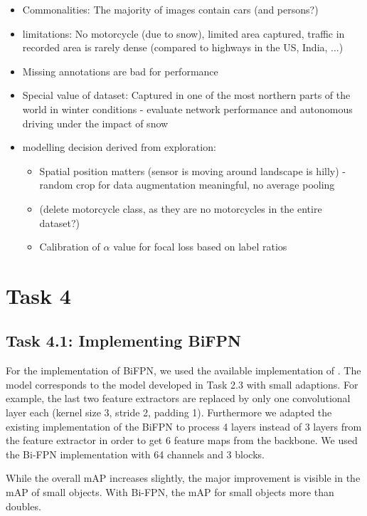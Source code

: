 \documentclass{article}
\begin{document}
\begin{itemize}
    \item Commonalities: The majority of images contain cars (and persons?)
    \item limitations: No motorcycle (due to snow), limited area captured, traffic in recorded area is rarely dense (compared to highways in the US, India, ...)
    \item Missing annotations are bad for performance
    \item Special value of dataset: Captured in one of the most northern parts of the world in winter conditions - evaluate network performance and autonomous driving under the impact of snow
    \item modelling decision derived from exploration:
        \begin{itemize}
            \item Spatial position matters (sensor is moving around landscape is hilly) - random crop for data augmentation meaningful, no average pooling
            \item (delete motorcycle class, as they are no motorcycles in the entire dataset?)
            \item Calibration of $\alpha$ value for focal loss based on label ratios
        \end{itemize}
\end{itemize}

\section*{Task 4}

\subsection*{Task 4.1: Implementing BiFPN}

For the implementation of BiFPN, we used the available implementation of \cite{efficientdet}. The model corresponds to the model developed in Task 2.3 with small adaptions. For example, the last two feature extractors are replaced by only one convolutional layer each (kernel size 3, stride 2, padding 1). Furthermore we adapted the existing implementation of the BiFPN to process 4 layers instead of 3 layers from the feature extractor in order to get 6 feature maps from the backbone. We used the Bi-FPN implementation with 64 channels and 3 blocks.

While the overall mAP increases slightly, the major improvement is visible in the mAP of small objects. With Bi-FPN, the mAP for small objects more than doubles.
\end{document}

